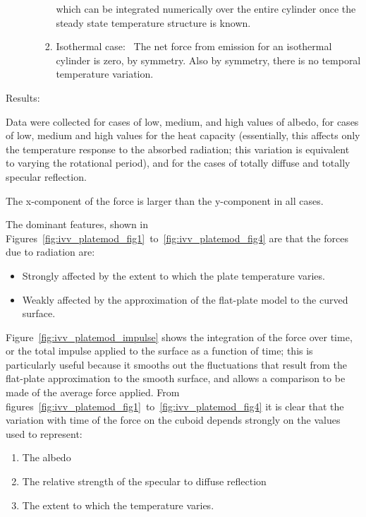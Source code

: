 \begin{description}
\begin{enumerate}
\begin{enumerate}
\begin{enumerate}
            which can be integrated numerically over the entire cylinder once
            the steady state temperature structure is known.

           \item{Isothermal case:}\ \newline
            The net force from emission for an isothermal cylinder is zero, by
            symmetry.   Also by symmetry, there is no temporal temperature
            variation.
           \end{enumerate}
        \end{enumerate}
      \end{enumerate}

   \item{Results:}

     Data were collected for cases of low, medium, and high values of albedo,
     for cases of
     low, medium and high values for the heat capacity (essentially, this
     affects only the temperature response to the absorbed radiation; this
     variation is equivalent to varying the rotational period), and for the
     cases of totally diffuse and totally specular reflection.

     The x-component of the force is larger than the y-component in all cases.

     The dominant features, shown  in
     Figures~\ref{fig:ivv_platemod_fig1}~to~\ref{fig:ivv_platemod_fig4}
     are that the forces due to radiation are:
     \begin{itemize}
        \item{}Strongly affected by the extent to which the plate
          temperature varies.
        \item{}Weakly affected by the approximation of the flat-plate model to the curved
           surface.
      \end{itemize}

      Figure~\ref{fig:ivv_platemod_impulse} shows the integration of the
      force over time, or the total impulse applied to the surface as a function of time; this is particularly useful because it smooths out the
      fluctuations that result from the flat-plate approximation to the smooth
      surface, and allows a comparison to be made of the average force applied.
      From
      figures~\ref{fig:ivv_platemod_fig1}~to~\ref{fig:ivv_platemod_fig4}
      it is clear that
      the variation with time of the force on the cuboid depends strongly on
      the values used to represent:
      \begin{enumerate}
        \item{}The albedo
        \item{}The relative strength of the specular to diffuse reflection
        \item{}The extent to which the temperature varies.
      \end{enumerate}


\end{description}
